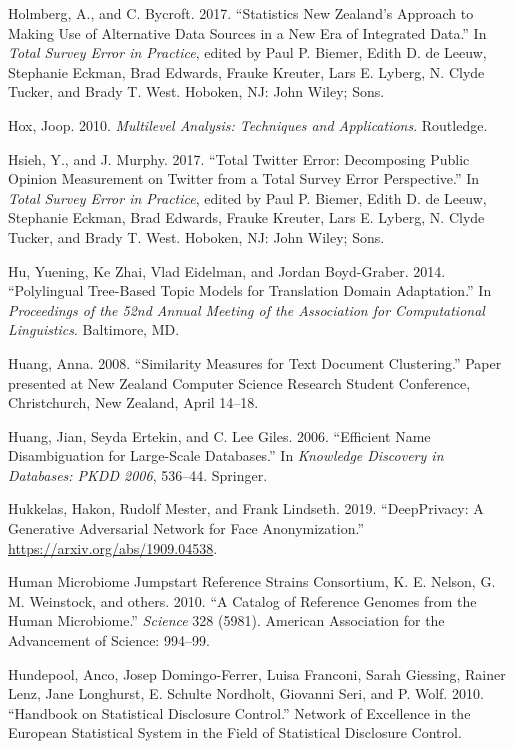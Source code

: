 \documentclass[]{krantz}
\begin{document}
\hypertarget{ref-Holmberg2017}{}
Holmberg, A., and C. Bycroft. 2017. ``Statistics New Zealand's Approach
to Making Use of Alternative Data Sources in a New Era of Integrated
Data.'' In \emph{Total Survey Error in Practice}, edited by Paul P.
Biemer, Edith D. de Leeuw, Stephanie Eckman, Brad Edwards, Frauke
Kreuter, Lars E. Lyberg, N. Clyde Tucker, and Brady T. West. Hoboken,
NJ: John Wiley; Sons.

\hypertarget{ref-hox2010multilevel}{}
Hox, Joop. 2010. \emph{Multilevel Analysis: Techniques and
Applications}. Routledge.

\hypertarget{ref-Hsieh2017}{}
Hsieh, Y., and J. Murphy. 2017. ``Total Twitter Error: Decomposing
Public Opinion Measurement on Twitter from a Total Survey Error
Perspective.'' In \emph{Total Survey Error in Practice}, edited by Paul
P. Biemer, Edith D. de Leeuw, Stephanie Eckman, Brad Edwards, Frauke
Kreuter, Lars E. Lyberg, N. Clyde Tucker, and Brady T. West. Hoboken,
NJ: John Wiley; Sons.

\hypertarget{ref-Hu:Zhai:Eidelman:Boyd-Graber-2014}{}
Hu, Yuening, Ke Zhai, Vlad Eidelman, and Jordan Boyd-Graber. 2014.
``Polylingual Tree-Based Topic Models for Translation Domain
Adaptation.'' In \emph{Proceedings of the 52nd Annual Meeting of the
Association for Computational Linguistics}. Baltimore, MD.

\hypertarget{ref-huang-08}{}
Huang, Anna. 2008. ``Similarity Measures for Text Document Clustering.''
Paper presented at New Zealand Computer Science Research Student
Conference, Christchurch, New Zealand, April 14--18.

\hypertarget{ref-HEG06}{}
Huang, Jian, Seyda Ertekin, and C. Lee Giles. 2006. ``Efficient Name
Disambiguation for Large-Scale Databases.'' In \emph{Knowledge Discovery
in Databases: PKDD 2006}, 536--44. Springer.

\hypertarget{ref-Hukkelas2019}{}
Hukkelas, Hakon, Rudolf Mester, and Frank Lindseth. 2019. ``DeepPrivacy:
A Generative Adversarial Network for Face Anonymization.''
\url{https://arxiv.org/abs/1909.04538}.

\hypertarget{ref-human2010catalog}{}
Human Microbiome Jumpstart Reference Strains Consortium, K. E. Nelson,
G. M. Weinstock, and others. 2010. ``A Catalog of Reference Genomes from
the Human Microbiome.'' \emph{Science} 328 (5981). American Association
for the Advancement of Science: 994--99.

\hypertarget{ref-hundepool2010handbook}{}
Hundepool, Anco, Josep Domingo-Ferrer, Luisa Franconi, Sarah Giessing,
Rainer Lenz, Jane Longhurst, E. Schulte Nordholt, Giovanni Seri, and P.
Wolf. 2010. ``Handbook on Statistical Disclosure Control.'' Network of
Excellence in the European Statistical System in the Field of
Statistical Disclosure Control.
\end{document}
